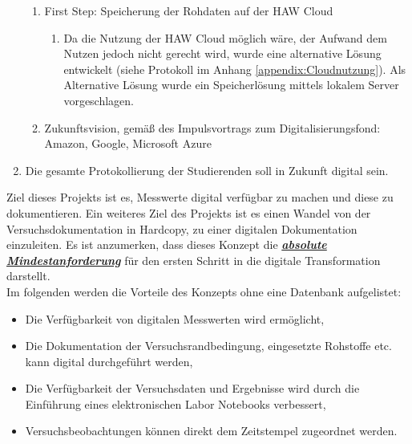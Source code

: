 \begin{enumerate}[leftmargin = 1.2em, label = \textbullet , itemsep = 0.1em]
	\begin{enumerate}[leftmargin = 1.2em, label = -- , itemsep = 0.1em]
	\item[\xmark] First Step: Speicherung der Rohdaten auf der HAW Cloud
		\begin{enumerate}[leftmargin = 1.2em, label = $\diamond$ , itemsep = 0.1em]
		\item Da die Nutzung der HAW Cloud möglich wäre, der Aufwand dem Nutzen jedoch nicht gerecht wird, wurde eine alternative Lösung entwickelt (siehe Protokoll im Anhang \ref{appendix:Cloudnutzung}). Als Alternative Lösung wurde ein Speicherlösung mittels lokalem Server vorgeschlagen.
		
		\end{enumerate} 
	\item[\xmark] Zukunftsvision, gemäß des Impulsvortrags zum Digitalisierungsfond: Amazon, Google, Microsoft Azure
	\end{enumerate}
	
\item[\xmark] Die gesamte Protokollierung der Studierenden soll in Zukunft digital sein.
\end{enumerate}

Ziel dieses Projekts ist es, Messwerte digital verfügbar zu machen und diese zu dokumentieren. Ein weiteres Ziel des Projekts ist es einen Wandel von der Versuchsdokumentation in Hardcopy, zu einer digitalen Dokumentation einzuleiten. Es ist anzumerken, dass dieses Konzept die \textbf{\emph{\underline{absolute Mindestanforderung}}} für den ersten Schritt in die digitale Transformation darstellt.\\

Im folgenden werden die Vorteile des Konzepts ohne eine Datenbank aufgelistet: 

\begin{itemize}
\singlespacing
\item Die Verfügbarkeit von digitalen Messwerten wird ermöglicht, 
\item Die Dokumentation der Versuchsrandbedingung, eingesetzte Rohstoffe etc. kann digital durchgeführt werden,
\item Die Verfügbarkeit der Versuchsdaten und Ergebnisse wird durch die Einführung eines elektronischen Labor Notebooks verbessert,
\item Versuchsbeobachtungen können direkt dem Zeitstempel zugeordnet werden.
\end{itemize}



